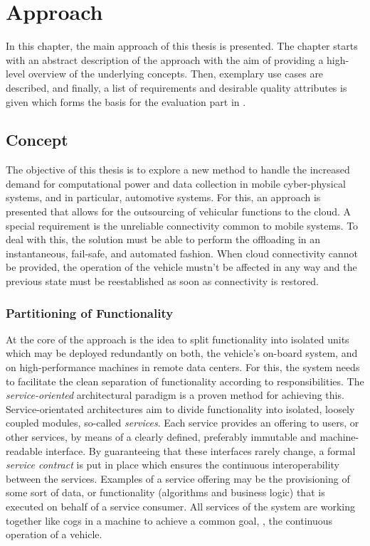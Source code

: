 
\chapter{Approach}\label{chapter:approach}

In this chapter, the main approach of this thesis is presented. The chapter starts with an abstract description of the approach with the aim of providing a high-level overview of the underlying concepts. Then, exemplary use cases are described, and finally, a list of requirements and desirable quality attributes is given which forms the basis for the evaluation part in .

%
%
%
%
%
%
%
%
%
%

\section{Concept} \label{sec:concept}
The objective of this thesis is to explore a new method to handle the increased demand for computational power and data collection in mobile cyber-physical systems, and in particular, automotive systems. For this, an approach is presented that allows for the outsourcing of vehicular functions to the cloud.
A special requirement is the unreliable connectivity common to mobile systems. To deal with this, the solution must be able to perform the offloading in an instantaneous, fail-safe, and automated fashion. When cloud connectivity cannot be provided, the operation of the vehicle mustn't be affected in any way and the previous state must be reestablished as soon as connectivity is restored.


\subsection{Partitioning of Functionality}
At the core of the approach is the idea to split functionality into isolated units which may be deployed redundantly on both, the vehicle's on-board system, and on high-performance machines in remote data centers. For this, the system needs to facilitate the clean separation of functionality according to responsibilities. The \emph{service-oriented} architectural paradigm \cite{erl2008soa} is a proven method for achieving this. Service-orientated architectures aim to divide functionality into isolated, loosely coupled modules, so-called \emph{services}. Each service provides an offering to users, or other services, by means of a clearly defined, preferably immutable and machine-readable interface. By guaranteeing that these interfaces rarely change, a formal \emph{service contract} is put in place which ensures the continuous interoperability between the services. Examples of a service offering may be the provisioning of some sort of data, or functionality (algorithms and business logic) that is executed on behalf of a service consumer. All services of the system are working together like cogs in a machine to achieve a common goal, \ie , the continuous operation of a vehicle.


